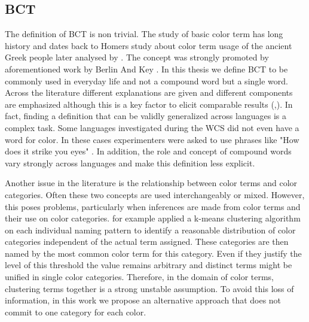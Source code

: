 \subsection{BCT}
The definition of BCT is non trivial. The study of basic color term has long history and dates back to Homers study about color term usage of the ancient Greek people \parencite{homer2015odyssey} later analysed by \textcite{gladstone1877colour}.
The concept was strongly promoted by aforementioned work by Berlin And Key \parencite{berlinBasic1969}. In this thesis we define BCT to be commonly used in everyday life and not a compound word but a single word. Across the literature different explanations are given and different components are emphasized although this is a key factor to elicit comparable results (\textcite{kayWorld2009},\textcite{lindseyColor2014}). In fact, finding a definition that can be validly generalized across languages is a complex task. Some languages investigated during the WCS did not even have a word for color. In these cases experimenters were asked to use phrases like "How does it strike you eyes" \parencite{kayWorld2016}. In addition, the role and concept of compound words vary strongly across languages and make this definition less explicit. 


Another issue in the literature is the relationship between color terms and color categories. Often these two concepts are used interchangeably or mixed. However, this poses problems, particularly when inferences are made from color terms and their use on color categories. \textcite{lindsey2009World} for example applied a k-means clustering algorithm on each individual naming pattern to identify a reasonable distribution of color categories independent of the actual term assigned. These categories are then named by the most common color term for this category. Even if they justify the level of this threshold the value remains arbitrary and distinct terms might be unified in single color categories. Therefore, in the domain of color terms, clustering terms together is a strong unstable assumption. To avoid this loss of information, in this work we propose an alternative approach that does not commit to one category for each color. 

